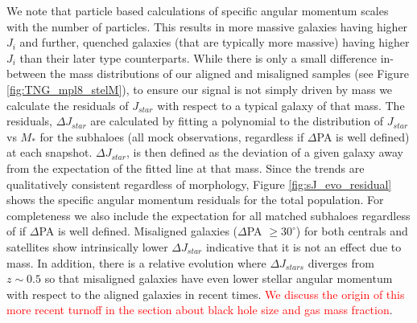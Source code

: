 \documentclass[fleqn,usenatbib]{mnras}
\newcommand{\red}[1]{{\textcolor{red}{#1}}}
\begin{document}
We note that particle based calculations of specific angular momentum scales with the number of particles. This results in more massive galaxies having higher $J_{i}$ and further, quenched galaxies (that are typically more massive) having higher $J_{i}$ than their later type counterparts. While there is only a small difference in-between the mass distributions of our aligned and misaligned samples (see Figure \ref{fig:TNG_mpl8_stelM}), to ensure our signal is not simply driven by mass we calculate the residuals of $J_{star}$ with respect to a typical galaxy of that mass. The residuals, $\Delta J_{star}$ are calculated by fitting a polynomial to the distribution of $J_{star}$ vs $M_{\ast}$ for the subhaloes (all mock observations, regardless if $\Delta$PA is well defined) at each snapshot. $\Delta J_{star}$, is then defined as the deviation of a given galaxy away from the expectation of the fitted line at that mass. Since the trends are qualitatively consistent regardless of morphology, Figure \ref{fig:sJ_evo_residual} shows the specific angular momentum residuals for the total population. For completeness we also include the expectation for all matched subhaloes regardless of if $\Delta$PA is well defined. Misaligned galaxies ($\Delta$PA $\geq 30^{\circ}$) for both centrals and satellites show intrinsically lower $\Delta J_{star}$ indicative that it is not an effect due to mass. In addition, there is a relative evolution where $\Delta J_{stars}$ diverges from $z \sim 0.5$ so that misaligned galaxies have even lower stellar angular momentum with respect to the aligned galaxies in recent times. \red{We discuss the origin of this more recent turnoff in the section about black hole size and gas mass fraction}.
\end{document}
